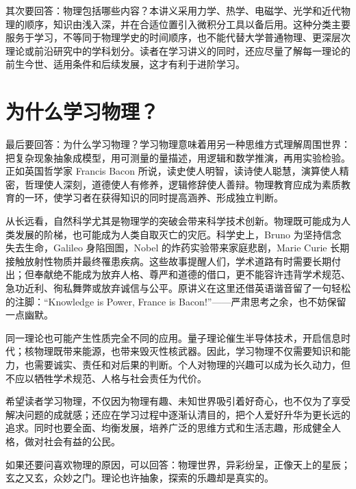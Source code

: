 \PrefaceParticleDiagram

其次要回答：物理包括哪些内容？本讲义采用力学、热学、电磁学、光学和近代物理的顺序，知识由浅入深，并在合适位置引入微积分工具以备后用。这种分类主要服务于学习，不等同于物理学史的时间顺序，也不能代替大学普通物理、更深层次理论或前沿研究中的学科划分。读者在学习讲义的同时，还应尽量了解每一理论的前生今世、适用条件和后续发展，这才有利于进阶学习。

\section*{为什么学习物理？}

最后要回答：为什么学习物理？学习物理意味着用另一种思维方式理解周围世界：把复杂现象抽象成模型，用可测量的量描述，用逻辑和数学推演，再用实验检验。正如英国哲学家 Francis Bacon 所说，读史使人明智，读诗使人聪慧，演算使人精密，哲理使人深刻，道德使人有修养，逻辑修辞使人善辩。物理教育应成为素质教育的一环，使学习者在获得知识的同时提高涵养、形成独立判断。

从长远看，自然科学尤其是物理学的突破会带来科学技术创新。物理既可能成为人类发展的阶梯，也可能成为人类自取灭亡的灾厄。科学史上，Bruno 为坚持信念失去生命，Galileo 身陷囹圄，Nobel 的炸药实验带来家庭悲剧，Marie Curie 长期接触放射性物质并最终罹患疾病。这些故事提醒人们，学术道路有时需要长期付出；但奉献绝不能成为放弃人格、尊严和道德的借口，更不能容许违背学术规范、急功近利、徇私舞弊或放弃诚信与公平。原讲义在这里还借英语谐音留了一句轻松的注脚：“Knowledge is Power, France is Bacon!”——严肃思考之余，也不妨保留一点幽默。

同一理论也可能产生性质完全不同的应用。量子理论催生半导体技术，开启信息时代；核物理既带来能源，也带来毁灭性核武器。因此，学习物理不仅需要知识和能力，也需要诚实、责任和对后果的判断。个人对物理的兴趣可以成为长久动力，但不应以牺牲学术规范、人格与社会责任为代价。


希望读者学习物理，不仅因为物理有趣、未知世界吸引着好奇心，也不仅为了享受解决问题的成就感；还应在学习过程中逐渐认清目的，把个人爱好升华为更长远的追求。同时也要全面、均衡发展，培养广泛的思维方式和生活志趣，形成健全人格，做对社会有益的公民。

如果还要问喜欢物理的原因，可以回答：物理世界，异彩纷呈，正像天上的星辰；玄之又玄，众妙之门。理论也许抽象，探索的乐趣却是真实的。


\mainmatter
